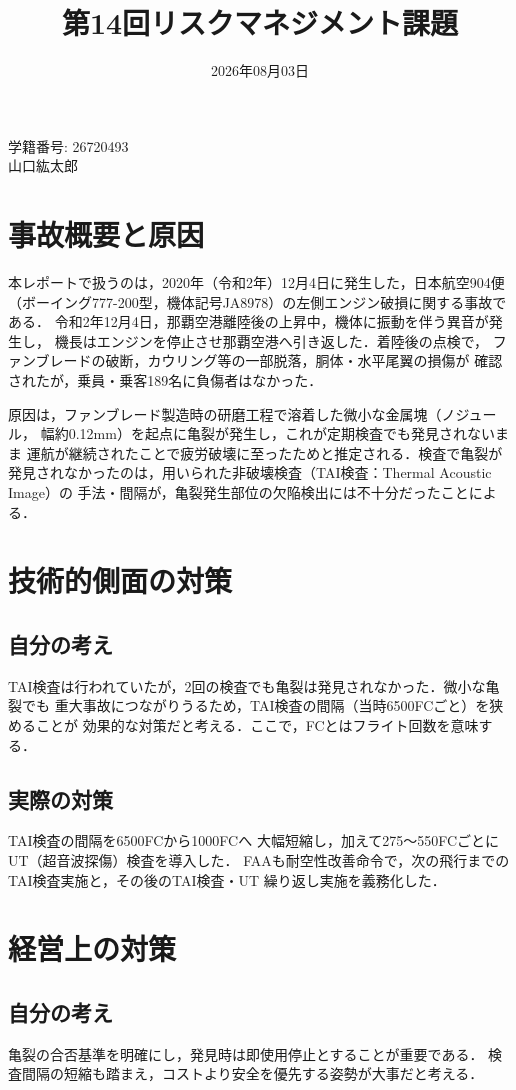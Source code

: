 \documentclass[10pt]{ltjsarticle}
\date{2026年08月03日}
\title{第14回リスクマネジメント課題}
\makeatletter
\newcommand{\authorname}{学籍番号: 26720493\\山口紘太郎}
\renewcommand{\maketitle}{%
  \begin{flushright}
    \small\@date
  \end{flushright}
  \vspace{0.1cm}
  \begin{center}
    {\large \@title}
  \end{center}
  \begin{flushright}
    {\normalsize \authorname}
  \end{flushright}
}
\makeatother
\begin{document}
{\small
\maketitle

\section{事故概要と原因}
本レポートで扱うのは，2020年（令和2年）12月4日に発生した，日本航空904便
（ボーイング777-200型，機体記号JA8978）の左側エンジン破損に関する事故である．
令和2年12月4日，那覇空港離陸後の上昇中，機体に振動を伴う異音が発生し，
機長はエンジンを停止させ那覇空港へ引き返した．着陸後の点検で，
ファンブレードの破断，カウリング等の一部脱落，胴体・水平尾翼の損傷が
確認されたが，乗員・乗客189名に負傷者はなかった．

原因は，ファンブレード製造時の研磨工程で溶着した微小な金属塊（ノジュール，
幅約0.12mm）を起点に亀裂が発生し，これが定期検査でも発見されないまま
運航が継続されたことで疲労破壊に至ったためと推定される．検査で亀裂が
発見されなかったのは，用いられた非破壊検査（TAI検査：Thermal Acoustic Image）の
手法・間隔が，亀裂発生部位の欠陥検出には不十分だったことによる．

\section{技術的側面の対策}
\subsection{自分の考え}
TAI検査は行われていたが，2回の検査でも亀裂は発見されなかった．微小な亀裂でも
重大事故につながりうるため，TAI検査の間隔（当時6500FCごと）を狭めることが
効果的な対策だと考える．ここで，FCとはフライト回数を意味する．

\subsection{実際の対策}
TAI検査の間隔を6500FCから1000FCへ
大幅短縮し，加えて275〜550FCごとにUT（超音波探傷）検査を導入した．
FAAも耐空性改善命令で，次の飛行までのTAI検査実施と，その後のTAI検査・UT
繰り返し実施を義務化した．

\section{経営上の対策}

\subsection{自分の考え}
亀裂の合否基準を明確にし，発見時は即使用停止とすることが重要である．
検査間隔の短縮も踏まえ，コストより安全を優先する姿勢が大事だと考える．

}
\end{document}
